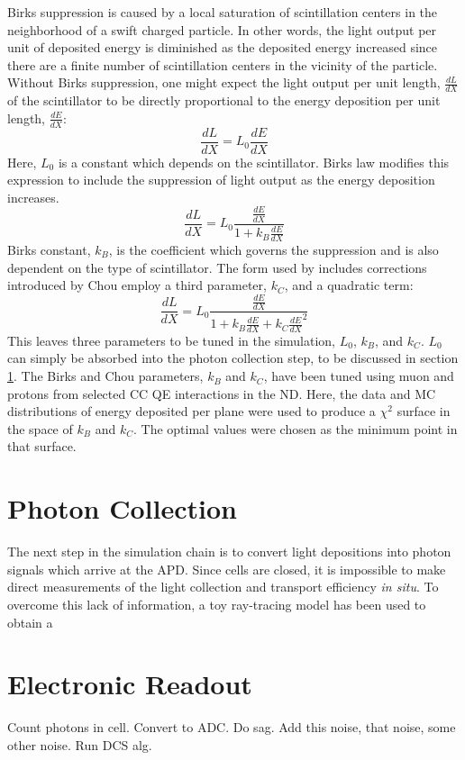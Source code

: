 Birks suppression is caused by a local saturation of scintillation centers in the neighborhood of a swift charged particle.  In other words, the light output per unit of deposited energy is diminished as the deposited energy increased since there are a finite number of scintillation centers in the vicinity of the particle.  Without Birks suppression, one might expect the light output per unit length, $\frac{dL}{dX}$ of the scintillator to be directly proportional to the energy deposition per unit length, $\frac{dE}{dX}$:
\begin{equation}
\frac{dL}{dX} = L_0  \frac{dE}{dX}
\end{equation}
Here, $L_0$ is a constant which depends on the scintillator.  Birks law modifies this expression to include the suppression of light output as the energy deposition increases.
\begin{equation}
\frac{dL}{dX} = L_0  \frac{\frac{dE}{dX}}{1+ k_B \frac{dE}{dX}}
\end{equation}
Birks constant, $k_B$, is the coefficient which governs the suppression and is also dependent on the type of scintillator.  The form used by \nova includes corrections introduced by Chou \cite{chou1952nature} employ a third parameter, $k_C$, and a quadratic term:
\begin{equation}
\frac{dL}{dX} = L_0  \frac{\frac{dE}{dX}}{1+ k_B \frac{dE}{dX} + k_C \frac{dE}{dX}^2}
\end{equation}
This leaves three parameters to be tuned in the simulation, $L_0$, $k_B$, and $k_C$.  $L_0$ can simply be absorbed into the photon collection step, to be discussed in section \ref{photoncoll}.  The Birks and Chou parameters, $k_B$ and $k_C$, have been tuned using muon and protons from selected \numu CC QE interactions in the ND.  Here, the data and MC distributions of energy deposited per plane were used to produce a $\chi^2$ surface in the space of $k_B$ and $k_C$.  The optimal values were chosen as the minimum point in that surface.


\section{Photon Collection}
\label{photoncoll}

The next step in the simulation chain is to convert light depositions into photon signals which arrive at the APD.  Since \nova cells are closed, it is impossible to make direct measurements of the light collection and transport efficiency \textit{in situ}.  To overcome this lack of information, a toy ray-tracing model has been used to obtain a 

\section{Electronic Readout}

Count photons in cell.  Convert to ADC.  Do sag.  Add this noise, that noise, some other noise.  Run DCS alg.



